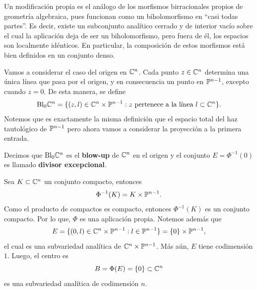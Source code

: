 Un modificación propia es el análogo de los morfismos birracionales	 propios de geometría algebraica, pues funcionan como un biholomorfismo en \enquote{casi todas partes}. Es decir, existe un subconjunto analítico cerrado y de interior vacío sobre el cual la aplicación deja de ser un biholomorfismo, pero fuera de él, los espacios son localmente idénticos. En particular, la composición de estos morfismos está bien definidos en un conjunto denso.

\begin{example}[Blow up]
	Vamos a considerar el caso del origen en $\mathbb{C}^n$. Cada punto $z\in \mathbb{C}^n$ determina una única línea que pasa por el origen, y en consecuencia un punto en $\mathbb{P}^{n-1}$, excepto cuando $z=0$. De esta manera, se define
	\begin{equation*}
		\mathrm{Bl}_0\mathbb{C}^n=\{(z,l)\in\mathbb{C}^n\times\mathbb{P}^{n-1}:z\text{ pertenece a la línea }l\subset\mathbb{C}^n\}.
	\end{equation*}
	Notemos que es exactamente la misma definición que el espacio total del haz tautológico de $\mathbb{P}^{n-1}$ pero ahora vamos a considerar la proyección a la primera entrada.	
	
	Decimos que $\mathrm{Bl}_0\mathbb{C}^n$ es el \textbf{blow-up} de $\mathbb{C}^n$ en el origen y el conjunto $E=\Phi^{-1}(0)$ es llamado \textbf{divisor excepcional}.
	
	Sea $K\subset\mathbb{C}^n$ un conjunto compacto, entonces
	\begin{equation*}
		\Phi^{-1}(K)=K\times \mathbb{P}^{n-1}.
	\end{equation*}
	Como el producto de compactos es compacto, entonces $\Phi^{-1}(K)$ es un conjunto compacto. Por lo que, $\Phi$ es una aplicación propia. Notemos además que
	\begin{equation*}
		E=\{(0,l)\in\mathbb{C}^n\times\mathbb{P}^{n-1}:l\in\mathbb{P}^{n-1}\}=\{0\}\times\mathbb{P}^{n-1},
	\end{equation*}
	el cual es una subvariedad analítica de $\mathbb{C}^n\times\mathbb{P}^{n-1}$. Más aún, $E$ tiene codimensión $1$. Luego, el centro es
	\begin{equation*}
		B=\Phi(E)=\{0\}\subset\mathbb{C}^n
	\end{equation*}
	es una subvariedad analítica de codimensión $n$.
	

\end{example}
